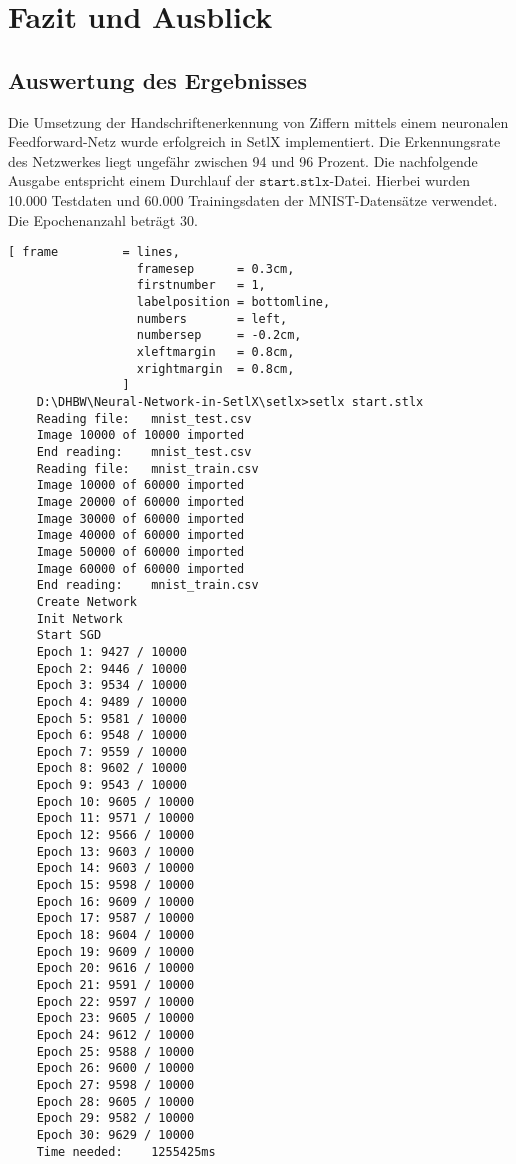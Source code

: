 \chapter{Fazit und Ausblick}

\section{Auswertung des Ergebnisses}
Die Umsetzung der Handschriftenerkennung von Ziffern mittels einem neuronalen Feedforward-Netz wurde erfolgreich in SetlX implementiert. Die Erkennungsrate des Netzwerkes liegt ungefähr zwischen 94 und 96 Prozent. Die nachfolgende Ausgabe entspricht einem Durchlauf der $\mathtt{start.stlx}$-Datei. Hierbei wurden 10.000 Testdaten und 60.000 Trainingsdaten der MNIST-Datensätze verwendet. Die Epochenanzahl beträgt 30.

\begin{Verbatim}[ frame         = lines, 
                  framesep      = 0.3cm, 
                  firstnumber   = 1,
                  labelposition = bottomline,
                  numbers       = left,
                  numbersep     = -0.2cm,
                  xleftmargin   = 0.8cm,
                  xrightmargin  = 0.8cm,
                ]
    D:\DHBW\Neural-Network-in-SetlX\setlx>setlx start.stlx
    Reading file:   mnist_test.csv
    Image 10000 of 10000 imported
    End reading:    mnist_test.csv
    Reading file:   mnist_train.csv
    Image 10000 of 60000 imported
    Image 20000 of 60000 imported
    Image 30000 of 60000 imported
    Image 40000 of 60000 imported
    Image 50000 of 60000 imported
    Image 60000 of 60000 imported
    End reading:    mnist_train.csv
    Create Network
    Init Network
    Start SGD
    Epoch 1: 9427 / 10000
    Epoch 2: 9446 / 10000
    Epoch 3: 9534 / 10000
    Epoch 4: 9489 / 10000
    Epoch 5: 9581 / 10000
    Epoch 6: 9548 / 10000
    Epoch 7: 9559 / 10000
    Epoch 8: 9602 / 10000
    Epoch 9: 9543 / 10000
    Epoch 10: 9605 / 10000
    Epoch 11: 9571 / 10000
    Epoch 12: 9566 / 10000
    Epoch 13: 9603 / 10000
    Epoch 14: 9603 / 10000
    Epoch 15: 9598 / 10000
    Epoch 16: 9609 / 10000
    Epoch 17: 9587 / 10000
    Epoch 18: 9604 / 10000
    Epoch 19: 9609 / 10000
    Epoch 20: 9616 / 10000
    Epoch 21: 9591 / 10000
    Epoch 22: 9597 / 10000
    Epoch 23: 9605 / 10000
    Epoch 24: 9612 / 10000
    Epoch 25: 9588 / 10000
    Epoch 26: 9600 / 10000
    Epoch 27: 9598 / 10000
    Epoch 28: 9605 / 10000
    Epoch 29: 9582 / 10000
    Epoch 30: 9629 / 10000
    Time needed:    1255425ms		
\end{Verbatim}

